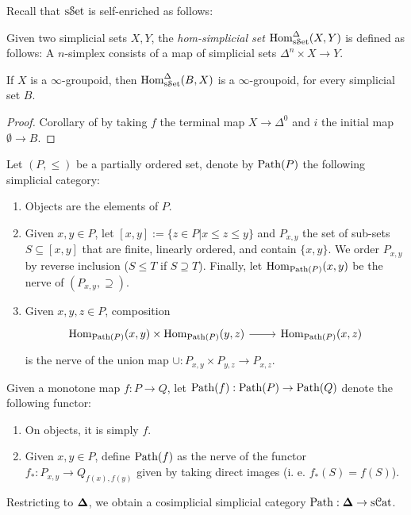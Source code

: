 \documentclass[10pt]{amsart}
\numberwithin{equation}{section}
\begin{document}
Recall that $\mathrm{s}\mathcal{S}\mathrm{et}$ is self-enriched as follows: 
\begin{definition}
   Given two simplicial sets $X,Y$, the \emph{hom-simplicial set} $\mathrm{Hom}^\Delta_{\mathrm{s}\mathcal{S}\mathrm{et}}(X,Y)$ is defined as follows: A $n$-simplex consists of a map of simplicial sets $\Delta^n\times X\to Y$. 
\end{definition}
\begin{lemma}\label{lem:functinfgrpd}
  If $X$ is a $\infty$-groupoid, then $\mathrm{Hom}^\Delta_{\mathrm{s}\mathcal{S}\mathrm{et}}(B,X)$ is a $\infty$-groupoid, for every simplicial set $B$. 
\end{lemma}
\begin{proof}
  Corollary of \cite{kerodon2026exponential} by taking $f$ the terminal map $X\to\Delta^0$ and $i$ the initial map $\emptyset\to B$. 
\end{proof}
\begin{definition}
  Let $(P,\leq)$ be a partially ordered set, denote by $\mathrm{Path}(P)$ the following simplicial category: 
  \begin{enumerate}
    \item Objects are the elements of $P$. 
    \item Given $x,y\in P$, let $[x,y]:=\{z\in P|x\leq z\leq y\}$ and $P_{x,y}$ the set of sub-sets $S\subseteq[x,y]$ that are finite, linearly ordered, and contain $\{x,y\}$. We order $P_{x,y}$ by reverse inclusion ($S\leq T$ if $S\supseteq T$). Finally, let $\mathrm{Hom}_{\mathrm{Path}(P)}(x,y)$ be the nerve of $(P_{x,y},\supseteq)$. 
    \item Given $x,y,z\in P$, composition \begin{equation}
      \begin{tikzcd}
        \hom_{\Path(P)}(x,y)\times\hom_{\Path(P)}(y,z) \arrow[r] & \hom_{\Path(P)}(x,z)
      \end{tikzcd}
    \end{equation} is the nerve of the union map $\cup:P_{x,y}\times P_{y,z}\to P_{x,z}$. 
  \end{enumerate}
  Given a monotone map $f:P\to Q$, let $\mathrm{Path}(f):\mathrm{Path}(P)\to\mathrm{Path}(Q)$ denote the following functor: 
  \begin{enumerate}
    \item On objects, it is simply $f$.
    \item Given $x,y\in P$, define $\mathrm{Path}(f)$ as the nerve of the functor $f_*:P_{x,y}\to Q_{f(x),f(y)}$ given by taking direct images (i. e. $f_*(S)=f(S)$). 
  \end{enumerate}
Restricting to $\bm{\Delta}$, we obtain a cosimplicial simplicial category $\mathrm{Path}:\bm{\Delta}\to\mathrm{s}\mathcal{C}\mathrm{at}$. 
\end{definition}
\end{document}
